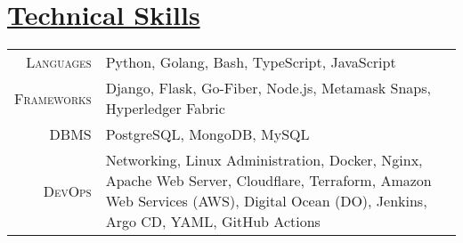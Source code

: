 \documentclass[a4paper,10pt]{extarticle} %
\begin{document}
 \vspace{+0.4cm} \section{\textcolor{primary}{\href{https://www.github.com/proffapt/bodhitree}{Technical Skills}}}

 \vspace{+0.2cm}

 \begin{tabular}{r|p{15cm}}
 \textsc{Languages} & Python, Golang, Bash, TypeScript, JavaScript \\
 \textsc{Frameworks} & Django, Flask, Go-Fiber, Node.js, Metamask Snaps, Hyperledger Fabric  \\
 \textsc{DBMS} & PostgreSQL, MongoDB, MySQL \\
 \textsc{DevOps} & Networking, Linux Administration, Docker, Nginx, Apache Web Server, Cloudflare, Terraform, Amazon Web Services (AWS), Digital Ocean (DO), Jenkins, Argo CD, YAML, GitHub Actions \\
 
\end{tabular}
\end{document}
